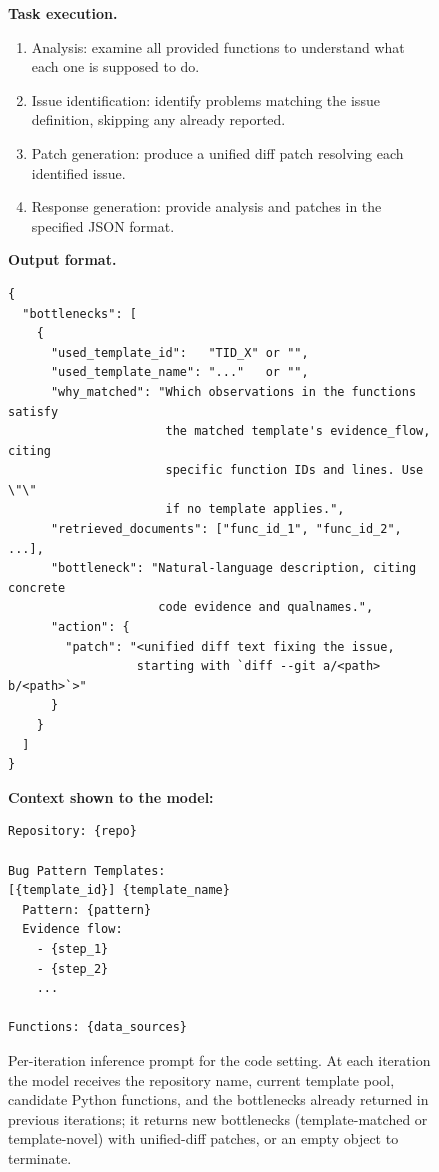 \begin{figure}[!t]
\begin{tcolorbox}[colback=gray!5, colframe=gray!50,
                  boxrule=0.5pt, arc=2mm,
                  left=4pt, right=4pt, top=3pt, bottom=3pt]
\medskip
\textbf{Task execution.}
\begin{enumerate}[topsep=0pt, itemsep=0ex, parsep=0pt, left=14pt]
   \item Analysis: examine all provided functions to understand what each one is supposed to do.
   \item Issue identification: identify problems matching the issue definition, skipping any already reported.
   \item Patch generation: produce a unified diff patch resolving each identified issue.
   \item Response generation: provide analysis and patches in the specified JSON format.
\end{enumerate}

\medskip
\textbf{Output format.}
\begin{verbatim}
{
  "bottlenecks": [
    {
      "used_template_id":   "TID_X" or "",
      "used_template_name": "..."   or "",
      "why_matched": "Which observations in the functions satisfy
                      the matched template's evidence_flow, citing
                      specific function IDs and lines. Use \"\"
                      if no template applies.",
      "retrieved_documents": ["func_id_1", "func_id_2", ...],
      "bottleneck": "Natural-language description, citing concrete
                     code evidence and qualnames.",
      "action": {
        "patch": "<unified diff text fixing the issue,
                  starting with `diff --git a/<path> b/<path>`>"
      }
    }
  ]
}
\end{verbatim}

\medskip
\textbf{Context shown to the model:}
\begin{verbatim}
Repository: {repo}

Bug Pattern Templates:
[{template_id}] {template_name}
  Pattern: {pattern}
  Evidence flow:
    - {step_1}
    - {step_2}
    ...

Functions: {data_sources}
\end{verbatim}
\end{tcolorbox}
\caption{Per-iteration inference prompt for the code setting. At each iteration the model receives the repository name, current template pool, candidate Python functions, and the bottlenecks already returned in previous iterations; it returns new bottlenecks (template-matched or template-novel) with unified-diff patches, or an empty object to terminate.}
\label{fig:prompt_inference_code}
\end{figure}
